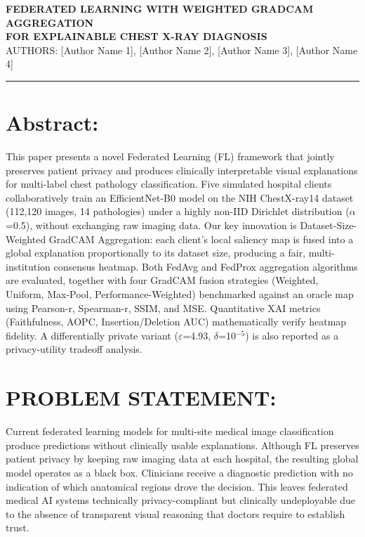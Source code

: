 \documentclass[10pt,a4paper]{article}
\begin{document}
\begin{center}
  {\large\bfseries\MakeUppercase{Federated Learning with Weighted GradCAM Aggregation\\
  for Explainable Chest X-Ray Diagnosis}}\\[4pt]
  {\normalsize AUTHORS: [Author Name 1], [Author Name 2], [Author Name 3], [Author Name 4]}
\end{center}

\noindent\rule{\linewidth}{0.6pt}
\vspace{2pt}

\section*{Abstract:}
This paper presents a novel Federated Learning (FL) framework that jointly preserves patient privacy
and produces clinically interpretable visual explanations for multi-label chest pathology classification.
Five simulated hospital clients collaboratively train an EfficientNet-B0 model on the NIH ChestX-ray14
dataset (112,120 images, 14 pathologies) under a highly non-IID Dirichlet distribution ($\alpha$=0.5),
without exchanging raw imaging data. Our key innovation is Dataset-Size-Weighted GradCAM Aggregation:
each client's local saliency map is fused into a global explanation proportionally to its dataset size,
producing a fair, multi-institution consensus heatmap. Both FedAvg and FedProx aggregation algorithms
are evaluated, together with four GradCAM fusion strategies (Weighted, Uniform, Max-Pool,
Performance-Weighted) benchmarked against an oracle map using Pearson-r, Spearman-r, SSIM, and MSE.
Quantitative XAI metrics (Faithfulness, AOPC, Insertion/Deletion AUC) mathematically verify heatmap
fidelity. A differentially private variant ($\varepsilon$=4.93, $\delta$=10$^{-5}$) is also reported as a
privacy-utility tradeoff analysis.

\section*{PROBLEM STATEMENT:}
Current federated learning models for multi-site medical image classification produce predictions without
clinically usable explanations. Although FL preserves patient privacy by keeping raw imaging data at each
hospital, the resulting global model operates as a black box. Clinicians receive a diagnostic prediction
with no indication of which anatomical regions drove the decision. This leaves federated medical AI
systems technically privacy-compliant but clinically undeployable due to the absence of transparent
visual reasoning that doctors require to establish trust.
\end{document}
